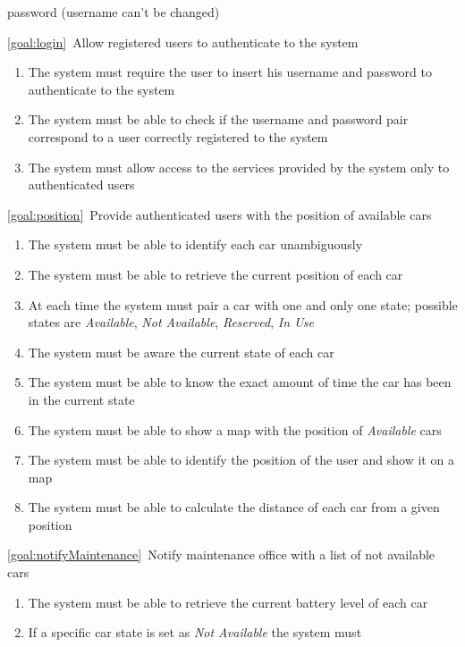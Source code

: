 \begin{description}
\begin{enumerate}[label=\textbf{R\arabic*}]
   				password (username can't be changed)
  			\end{enumerate}
		\item \ref{goal:login}\ Allow registered users to authenticate to the system
			\begin{enumerate}[resume*]
  				\item The system must require the user to insert his username and password to
  				authenticate to the system
   				\item The system must be able to check if the username and password pair
   				correspond to a user correctly registered to the system
   				\item The system must allow access to the services provided by the system only to
   				authenticated users 
			\end{enumerate}
		\item \ref{goal:position}\ Provide authenticated users with the position of available cars
			\begin{enumerate}[resume*]
				\item The system must be able to identify each car unambiguously
  				\item The system must be able to retrieve the current position of each car
  				\item At each time the system must pair a car with one and only one state; possible
  				states are \emph{Available}, \emph{Not Available}, \emph{Reserved}, \emph{In Use}
   				\item The system must be aware the current state of each car
   				\item The system must be able to know the exact amount of time the car has been in
   				the current state
   				\item The system must be able to show a map with the position of \emph{Available}
   				cars
  				\item The system must be able to identify the position of the user and show it on a
  				map
   				\item The system must be able to calculate the distance of each car from a given
   				position
  			\end{enumerate}
		\item \ref{goal:notifyMaintenance}\ Notify maintenance office with a list of not available
		cars
			\begin{enumerate}[resume*]
   				\item The system must be able to retrieve the current battery level of each car
   				\item If a specific car state is set as \emph{Not Available} the system must 

\end{enumerate}
\end{description}
